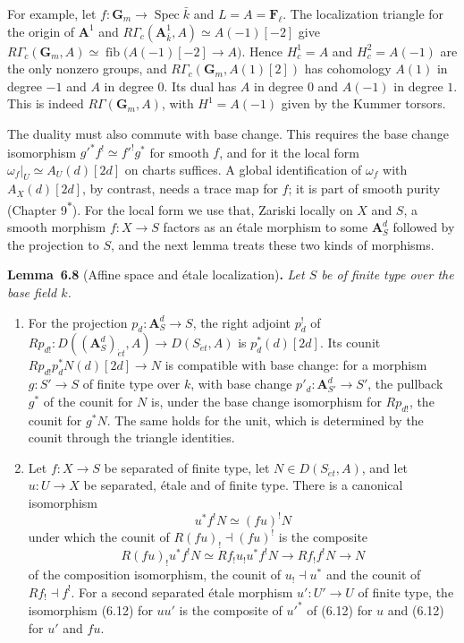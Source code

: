 \documentclass[11pt]{article}
\newenvironment{bpstatement}[2]{\par\addvspace{0.6\baselineskip}\noindent\textbf{#1}#2\textbf{.}\enspace\ignorespaces}
  {\par\addvspace{0.4\baselineskip}}
\newenvironment{bpstatementit}[2]{\begin{bpstatement}{#1}{#2}\itshape\ignorespaces}{\end{bpstatement}}
\newcommand{\bpout}[1]{#1\textsuperscript{\hyperlink{bp-outside}{\ensuremath{\ast}}}}
\providecommand{\Fell}{}\renewcommand{\Fell}{\mathbf F_\ell}
\providecommand{\fib}{}\renewcommand{\fib}{\operatorname{fib}}
\begin{document}
For example, let \(f:\mathbf G_m\to\operatorname{Spec}\bar k\) and \(L=A=\Fell\). The localization triangle for the origin of \(\mathbf A^1\) and \(R\Gamma_c(\mathbf A^1_{\bar k},A)\simeq A(-1)[-2]\) give \(R\Gamma_c(\mathbf G_m,A)\simeq\fib\bigl(A(-1)[-2]\to A\bigr)\). Hence \(H^1_c=A\) and \(H^2_c=A(-1)\) are the only nonzero groups, and \(R\Gamma_c(\mathbf G_m,A(1)[2])\) has cohomology \(A(1)\) in degree \(-1\) and \(A\) in degree \(0\). Its dual has \(A\) in degree \(0\) and \(A(-1)\) in degree \(1\). This is indeed \(R\Gamma(\mathbf G_m,A)\), with \(H^1=A(-1)\) given by the Kummer torsors.

The duality must also commute with base change. This requires the base change isomorphism \(g'^*f^!\simeq f'^!g^*\) for smooth \(f\), and for it the local form \(\omega_f|_U\simeq A_U(d)[2d]\) on charts suffices. A global identification of \(\omega_f\) with \(A_X(d)[2d]\), by contrast, needs a trace map for \(f\); it is part of smooth purity (Chapter \bpout{9}). For the local form we use that, Zariski locally on \(X\) and \(S\), a smooth morphism \(f:X\to S\) factors as an étale morphism to some \(\mathbf A^d_S\) followed by the projection to \(S\), and the next lemma treats these two kinds of morphisms.

\label{bp538}%
\begin{bpstatementit}{Lemma~6.8}{ (Affine space and étale localization)}
Let \(S\) be of finite type over the base field \(k\).

\begin{enumerate}
\item For the projection \(p_d:\mathbf A^d_S\to S\), the right adjoint \(p_d^!\) of \(Rp_{d!}:D((\mathbf A^d_S)_{\acute{e}t},A)
\to D(S_{\acute{e}t},A)\) is \(p_d^*(d)[2d]\). Its counit \(Rp_{d!}p_d^*N(d)[2d]\to N\) is compatible with base change: for a morphism \(g:S'\to S\) of finite type over \(k\), with base change \(p'_d:\mathbf A^d_{S'}\to S'\), the pullback \(g^*\) of the counit for \(N\) is, under the base change isomorphism for \(Rp_{d!}\), the counit for \(g^*N\). The same holds for the unit, which is determined by the counit through the triangle identities.
\item Let \(f:X\to S\) be separated of finite type, let \(N\in D(S_{\acute{e}t},A)\), and let \(u:U\to X\) be separated, étale and of finite type. There is a canonical isomorphism \[
   u^*f^!N\simeq(fu)^!N
   \tag{6.12}
   \] under which the counit of \(R(fu)_!\dashv(fu)^!\) is the composite \[
   R(fu)_!u^*f^!N\simeq Rf_!u_!u^*f^!N\longrightarrow Rf_!f^!N
   \longrightarrow N
   \] of the composition isomorphism, the counit of \(u_!\dashv u^*\) and the counit of \(Rf_!\dashv f^!\). For a second separated étale morphism \(u':U'\to U\) of finite type, the isomorphism (6.12) for \(uu'\) is the composite of \(u'^*\) of (6.12) for \(u\) and (6.12) for \(u'\) and \(fu\).
\end{enumerate}
\end{bpstatementit}
\end{document}
